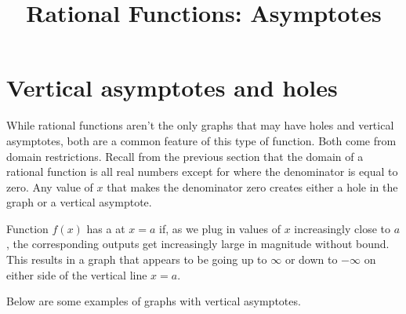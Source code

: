 \documentclass{ximera}
\title{Rational Functions: Asymptotes}
\begin{document}
\begin{abstract} \end{abstract}
\maketitle



\section{Vertical asymptotes and holes}
While rational functions aren't the only graphs that may have holes and vertical asymptotes, both are a common feature of this type of function. Both come from domain restrictions. Recall from the previous section that the domain of a rational function is all real numbers except for where the denominator is equal to zero. Any value of $x$ that makes the denominator zero creates either a hole in the graph or a vertical asymptote.

\begin{definition}
  Function $f(x)$ has a  at $x=a$ if, as we plug in values of $x$ increasingly close to $a$, the corresponding outputs get increasingly large in magnitude without bound. This results in a graph that appears to be going up to $\infty$ or down to $-\infty$ on either side of the vertical line $x=a$.
\end{definition}

Below are some examples of graphs with vertical asymptotes. 

 \hfill
{}\hfill
{}
\vspace{-.1in}
\end{document}
